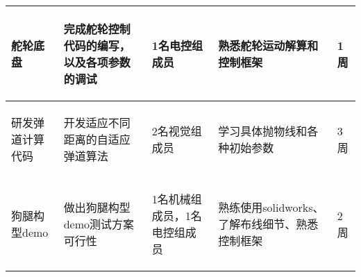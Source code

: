 \begin{longtable}{ p{2cm} | p{3cm} | p{3cm} | p{4.8cm} | p{2cm} |}
    \hline
    
        \begin{center}
            舵轮底盘
        \end{center} &
        \begin{center}
            完成舵轮控制代码的编写，以及各项参数的调试
        \end{center} &
        \begin{center}
            1名电控组成员
        \end{center} &
        \begin{center}
            熟悉舵轮运动解算和控制框架
        \end{center} &
        \begin{center}
            1周
        \end{center}\\

    \hline
    
        \begin{center}
            研发弹道计算代码
        \end{center} &
        \begin{center}
            开发适应不同距离的自适应弹道算法
        \end{center} &
        \begin{center}
            2名视觉组成员
        \end{center} &
        \begin{center}
            学习具体抛物线和各种初始参数
        \end{center} &
        \begin{center}
            3周
        \end{center} \\
        
    \hline
    
        \begin{center}
            狗腿构型demo
        \end{center} &
        \begin{center}
            做出狗腿构型demo测试方案可行性
        \end{center} &
        \begin{center}
            1名机械组成员，1名电控组成员
        \end{center} &
        \begin{center}
            熟练使用solidworks、了解布线细节、熟悉控制框架
        \end{center} &
        \begin{center}
            2周
        \end{center} \\

    \hline
    
\end{longtable}
